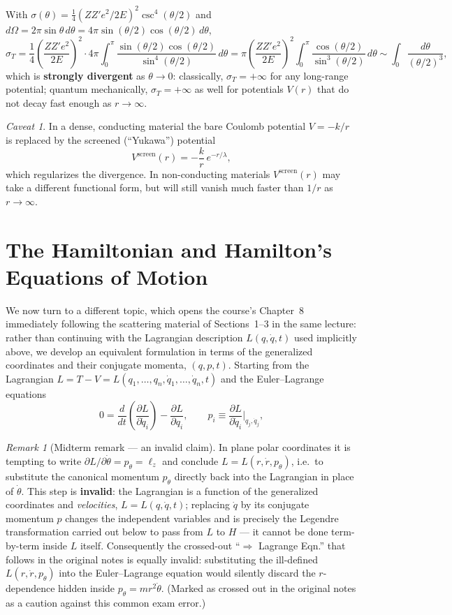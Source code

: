 \documentclass[11pt]{article}
\theoremstyle{remark}
\newtheorem{remark}{Remark}
\newtheorem{caveat}{Caveat}
\begin{document}
With $\sigma(\theta) = \tfrac14(ZZ'e^2/2E)^2\csc^4(\theta/2)$ and
$d\Omega = 2\pi\sin\theta\,d\theta = 4\pi\sin(\theta/2)\cos(\theta/2)\,d\theta$,
\[
  \sigma_T = \frac14\left(\frac{ZZ'e^2}{2E}\right)^2 \cdot 4\pi
  \int_0^\pi \frac{\sin(\theta/2)\cos(\theta/2)}{\sin^4(\theta/2)}\,d\theta
  = \pi\left(\frac{ZZ'e^2}{2E}\right)^2
  \int_0^\pi \frac{\cos(\theta/2)}{\sin^3(\theta/2)}\,d\theta
  \sim \int_0 \frac{d\theta}{(\theta/2)^3},
\]
which is \textbf{strongly divergent} as $\theta\to0$: classically,
$\sigma_T = +\infty$ for any long-range potential; quantum mechanically,
$\sigma_T=+\infty$ as well for potentials $V(r)$ that do not decay fast enough
as $r\to\infty$.

\begin{caveat}
In a dense, conducting material the bare Coulomb potential $V=-k/r$ is
replaced by the screened (``Yukawa'') potential
\[
  V^{\text{screen}}(r) = -\frac{k}{r}\,e^{-r/\lambda},
\]
which regularizes the divergence. In non-conducting materials
$V^{\text{screen}}(r)$ may take a different functional form, but will still
vanish much faster than $1/r$ as $r\to\infty$.
\end{caveat}

\section{The Hamiltonian and Hamilton's Equations of Motion}

We now turn to a different topic, which opens the course's Chapter~8
immediately following the scattering material of Sections~1--3 in the same
lecture: rather than continuing with the Lagrangian description
$L(q,\dot q,t)$ used implicitly above, we develop an equivalent formulation
in terms of the generalized coordinates and their conjugate momenta,
$(q,p,t)$. Starting from the Lagrangian $L = T - V = L(q_1,\dots,q_n,\dot q_1,\dots,\dot q_n,t)$
and the Euler--Lagrange equations
\[
  0 = \frac{d}{dt}\left(\frac{\partial L}{\partial \dot q_i}\right) - \frac{\partial L}{\partial q_i},
  \qquad p_i \equiv \frac{\partial L}{\partial \dot q_i}\bigg|_{q_j,\dot q_j},
\]

\begin{remark}[Midterm remark --- an invalid claim]
In plane polar coordinates it is tempting to write
$\partial L/\partial\dot\theta = p_\theta = \ell_z$ and conclude
$L = L(r,\dot r, p_\theta)$, i.e.\ to substitute the canonical momentum
$p_\theta$ directly back into the Lagrangian in place of $\dot\theta$. This
step is \textbf{invalid}: the Lagrangian is a function of the generalized
coordinates and \emph{velocities}, $L=L(q,\dot q,t)$; replacing $\dot q$ by its
conjugate momentum $p$ changes the independent variables and is precisely the
Legendre transformation carried out below to pass from $L$ to $H$ --- it
cannot be done term-by-term inside $L$ itself. Consequently the
crossed-out ``$\Rightarrow$ Lagrange Eqn.'' that follows in the original
notes is equally invalid: substituting the ill-defined $L(r,\dot r,p_\theta)$
into the Euler--Lagrange equation would silently discard the
$r$-dependence hidden inside $p_\theta = mr^2\dot\theta$. (Marked as crossed
out in the original notes as a caution against this common exam error.)
\end{remark}
\end{document}
